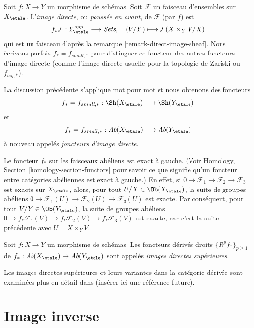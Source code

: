 \begin{definition}
\label{definition-direct-image-sheaf}
Soit $f: X\to Y$ un morphisme de sch\'emas.
Soit $\mathcal{F} $ un faisceau d'ensembles sur $X_\etale$.
L'{\it image directe}, ou {\it pouss\'ee en avant}, de $\mathcal{F}$
(par $f$) est
$$
f_*\mathcal{F} : Y_\etale^{opp} \longrightarrow \textit{Sets}, \quad
(V/Y) \longmapsto \mathcal{F}(X \times_Y V/X)
$$
qui est un faisceau d'apr\`es la
remarque \ref{remark-direct-image-sheaf}.
Nous \`ecrivons parfois $f_* = f_{small, *}$ pour distinguer ce foncteur des autres
foncteurs d'image directe (comme l'image directe usuelle pour la topologie de Zariski ou $f_{big, *}$).
\end{definition}

\noindent
La discussion pr\'ec\'edente s'applique mot pour mot et nous obtenons des foncteurs
$$
f_* = f_{small, *} :
\Sh(X_\etale)
\longrightarrow
\Sh(Y_\etale)
$$
et
$$
f_* = f_{small, *} :
\textit{Ab}(X_\etale)
\longrightarrow
\textit{Ab}(Y_\etale)
$$
\`a nouveau appel\'es {\it foncteurs d'image directe}.

\medskip\noindent
Le foncteur $f_*$ sur les faisceaux ab\'eliens est exact \`a gauche. (Voir
Homology, Section \ref{homology-section-functors}
pour savoir ce que signifie qu'un foncteur entre cat\'egories ab\'eliennes est exact \`a gauche.)
En effet, si
$0 \to \mathcal{F}_1 \to \mathcal{F}_2 \to \mathcal{F}_3$
est exacte sur $X_\etale$, alors, pour tout
$U/X \in \Ob(X_\etale)$,
la suite de groupes ab\'eliens
$0 \to \mathcal{F}_1(U) \to \mathcal{F}_2(U) \to \mathcal{F}_3(U)$
est exacte. Par cons\'equent, pour tout $V/Y \in \Ob(Y_\etale)$,
la suite de groupes ab\'eliens
$0 \to f_*\mathcal{F}_1(V) \to f_*\mathcal{F}_2(V) \to f_*\mathcal{F}_3(V)$
est exacte, car c'est la suite pr\'ec\'edente avec $U = X \times_Y V$.

\begin{definition}
\label{definition-higher-direct-images}
Soit $f: X \to Y$ un morphisme de sch\'emas.
Les foncteurs d\'eriv\'es droits $\{R^pf_*\}_{p \geq 1}$ de
$f_* : \textit{Ab}(X_\etale) \to \textit{Ab}(Y_\etale)$
sont appel\'es {\it images directes sup\'erieures}.
\end{definition}

\noindent
Les images directes sup\'erieures et leurs variantes dans la cat\'egorie d\'eriv\'ee
sont examin\'ees plus en d\'etail dans (ins\'erer ici une r\'ef\'erence future).



\section{Image inverse}
\label{section-inverse-image}

